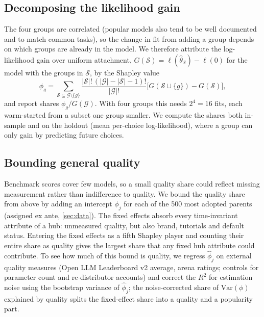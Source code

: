 \subsection{Decomposing the likelihood gain}
\label{sec:shapley}
The four groups are correlated (popular models also tend to be well documented and to match common tasks), so the
change in fit from adding a group depends on which groups are already in the model. We therefore attribute the
log-likelihood gain over uniform attachment, $G(\mathcal{S}) = \ell(\hat\theta_{\mathcal{S}}) - \ell(0)$ for the
model with the groups in $\mathcal{S}$, by the Shapley value \citep{shapley1953value}
\begin{equation}
  \phi_g = \sum_{\mathcal{S} \subseteq \mathcal{G} \setminus \{g\}}
  \frac{|\mathcal{S}|!\,(|\mathcal{G}|-|\mathcal{S}|-1)!}{|\mathcal{G}|!}
  \big[G(\mathcal{S} \cup \{g\}) - G(\mathcal{S})\big],
  \label{eq:shapley}
\end{equation}
and report shares $\phi_g / G(\mathcal{G})$. With four groups this needs $2^4 = 16$ fits, each warm-started from
a subset one group smaller. We compute the shares both in-sample and on the holdout (mean per-choice
log-likelihood), where a group can only gain by predicting future choices.

\subsection{Bounding general quality}
\label{sec:bounds}
Benchmark scores cover few models, so a small quality share could reflect missing measurement rather than
indifference to quality. We bound the quality share from above by adding an intercept $\phi_j$ for each of the
500 most adopted parents (assigned ex ante, \cref{sec:data}). The fixed effects absorb every time-invariant
attribute of a hub: unmeasured quality, but also brand, tutorials and default status. Entering the fixed effects as
a fifth Shapley player and counting their entire share as quality gives the largest share that any fixed hub
attribute could contribute. To see how much of this bound is quality, we regress $\hat\phi_j$ on external quality
measures (Open LLM Leaderboard v2 average, arena ratings; controls for parameter count and re-distributor accounts)
and correct the $R^2$ for estimation noise using the bootstrap variance of $\hat\phi_j$; the noise-corrected share
of $\mathrm{Var}(\phi)$ explained by quality splits the fixed-effect share into a quality and a popularity part.

